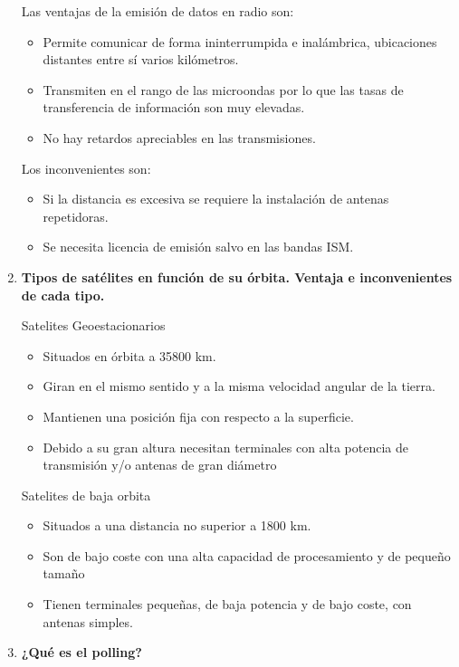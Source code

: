 \documentclass[10pt,a4paper,spanish]{article}
\begin{document}
\begin{enumerate}
    \noindent
    Las ventajas de la emisión de datos en radio son:
    \begin{itemize}
      \item Permite comunicar de forma ininterrumpida e inalámbrica, ubicaciones distantes entre sí varios kilómetros.
      \item Transmiten en el rango de las microondas por lo que las tasas de transferencia de información son muy elevadas.
      \item No hay retardos apreciables en las transmisiones.
    \end{itemize}

    Los inconvenientes son:
    \begin{itemize}
      \item Si la distancia es excesiva se requiere la instalación de antenas repetidoras.
      \item Se necesita licencia de emisión salvo en las bandas ISM.
    \end{itemize}

    \item \textbf{Tipos de satélites en función de su órbita. Ventaja e inconvenientes de cada tipo.}

    \noindent
    Satelites Geoestacionarios
    \begin{itemize}
      \item Situados en órbita a 35800 km.
      \item Giran en el mismo sentido y a la misma velocidad angular de la tierra.
      \item Mantienen una posición fija con respecto a la superficie.
      \item Debido a su gran altura necesitan terminales con alta potencia de transmisión y/o antenas de gran diámetro
    \end{itemize}

    Satelites de baja orbita
    \begin{itemize}
      \item Situados a una distancia no superior a 1800 km.
      \item Son de bajo coste con una alta capacidad de procesamiento y de pequeño tamaño
      \item Tienen terminales pequeñas, de baja potencia y de bajo coste, con antenas simples.
    \end{itemize}


    \item \textbf{¿Qué es el polling?}


\end{enumerate}
\end{document}
